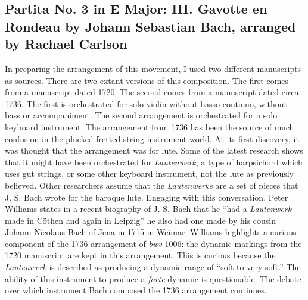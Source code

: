 \documentclass{tufte-handout}
\newcommand{\textls}[2][5]{%
    \begingroup\addfontfeatures{LetterSpace=#1}#2\endgroup
  }
\renewcommand{\smallcapsspacing}[1]{\textls[10]{#1}}
\renewcommand{\textsc}[1]{\smallcapsspacing{\textsmallcaps{#1}}}
\begin{document}
\subsection*{Partita No. 3 in E Major: III. Gavotte en Rondeau by Johann Sebastian Bach, arranged by Rachael Carlson}
\label{sec:partita-no.-3}

In preparing the arrangement of this movement, I used two different
manuscripts as sources. There are two extant versions of this composition. The
first comes from a manuscript dated 1720. The second comes from a manuscript
dated circa 1736. The first is orchestrated for solo violin without basso
continuo, without bass or accompaniment. The second arrangement is
orchestrated for a solo keyboard instrument. The arrangement from 1736 has
been the source of much confusion in the plucked fretted-string instrument
world. At its first discovery, it was thought that the arrangement was for
lute. Some of the latest research shows that it might have been orchestrated
for \emph{Lautenwerk}, a type of harpsichord which uses gut strings, or some
other keyboard instrument, not the lute as previously believed. Other
researchers assume that the \emph{Lautenwerke} are a set of pieces that
J. S. Bach wrote for the baroque lute. Engaging with this conversation, Peter
Williams states in a recent biography of J. S. Bach that he ``had a
\emph{Lautenwerk} made in Cöthen and again in Leipzig'' he also had one made
by his cousin Johann Nicolaus Bach of Jena in 1715 in Weimar. Williams
highlights a curious component of the 1736 arrangement of \emph{bwv} 1006: the
dynamic markings from the 1720 manuscript are kept in this arrangement. This
is curious because the \emph{Lautenwerk} is described as producing a dynamic
range of ``soft to very soft.'' The ability of this instrument to produce a
\emph{forte} dynamic is questionable. The debate over which instrument Bach
composed the 1736 arrangement continues.
\end{document}
